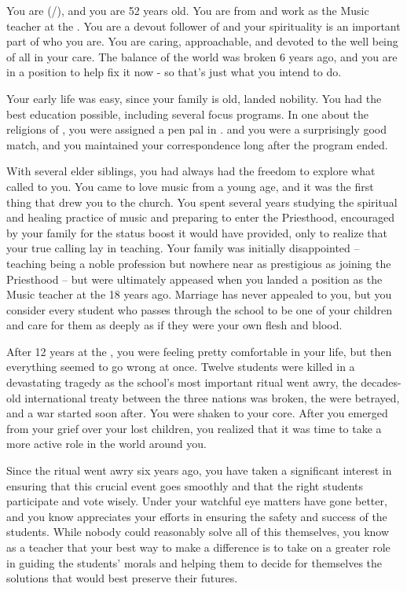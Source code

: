 \documentclass[char]{GL2020}
\begin{document}
\name{\cMusic{}}


You are \cMusic{} (\cMusic{\they}/\cMusic{\them}), and you are 52 years old. You are from \pFarm{} and work as the Music teacher at the \pSchool{}. You are a devout follower of \cFarmGod{} and your spirituality is an important part of who you are. You are caring, approachable, and devoted to the well being of all in your care. The balance of the world was broken 6 years ago, and you are in a position to help fix it now - so that's just what you intend to do.

Your early life was easy, since your family is old, landed nobility. You had the best education possible, including several focus programs. In one about the religions of \pEarth{}, you were assigned a pen pal in \pTech{}. \cBeetle{} and you were a surprisingly good match, and you maintained your correspondence long after the program ended. 

With several elder siblings, you had always had the freedom to explore what called to you.  You came to love music from a young age, and it was the first thing that drew you to the church. You spent several years studying the spiritual and healing practice of music and preparing to enter the Priesthood, encouraged by your family for the status boost it would have provided, only to realize that your true calling lay in teaching. Your family was initially disappointed -- teaching being a noble profession but nowhere near as prestigious as joining the Priesthood -- but were ultimately appeased when you landed a position as the Music teacher at the \pSchool{} 18 years ago. Marriage has never appealed to you, but you consider every student who passes through the school to be one of your children and care for them as deeply as if they were your own flesh and blood.

After 12 years at the \pSchool{}, you were feeling pretty comfortable in your life, but then everything seemed to go wrong at once. Twelve students were killed in a devastating tragedy as the school’s most important ritual went awry, the decades-old international treaty between the three nations was broken, the \pShip{} were betrayed, and a war started soon after. You were shaken to your core.  After you emerged from your grief over your lost children, you realized that it was time to take a more active role in the world around you.

Since the ritual went awry six years ago, you have taken a significant interest in ensuring that this crucial event goes smoothly and that the right students participate and vote wisely.  Under your watchful eye matters have gone better, and you know \cPrincipal{} appreciates your efforts in ensuring the safety and success of the students. While nobody could reasonably solve all of this themselves, you know as a teacher that your best way to make a difference is to take on a greater role in guiding the students' morals and helping them to decide for themselves the solutions that would best preserve their futures.
\end{document}
